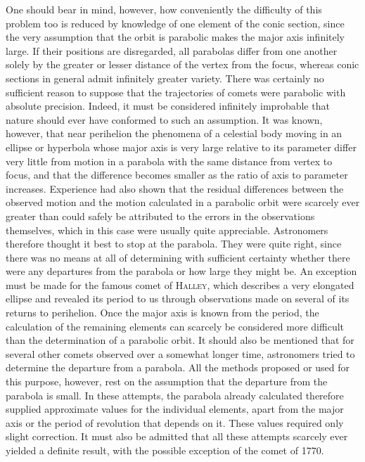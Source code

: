 One should bear in mind, however, how conveniently the difficulty of this problem too is reduced by knowledge of one element of the conic section, since the very assumption that the orbit is parabolic makes the major axis infinitely large. If their positions are disregarded, all parabolas differ from one another solely by the greater or lesser distance of the vertex from the focus, whereas conic sections in general admit infinitely greater variety. There was certainly no sufficient reason to suppose that the trajectories of comets were parabolic with absolute precision. Indeed, it must be considered infinitely improbable that nature should ever have conformed to such an assumption. It was known, however, that near perihelion the phenomena of a celestial body moving in an ellipse or hyperbola whose major axis is very large relative to its parameter differ very little from motion in a parabola with the same distance from vertex to focus, and that the difference becomes smaller as the ratio of axis to parameter increases. Experience had also shown that the residual differences between the observed motion and the motion calculated in a parabolic orbit were scarcely ever greater than could safely be attributed to the errors in the observations themselves, which in this case were usually quite appreciable. Astronomers therefore thought it best to stop at the parabola. They were quite right, since there was no means at all of determining with sufficient certainty whether there were any departures from the parabola or how large they might be. An exception must be made for the famous comet of \textsc{Halley}, which describes a very elongated ellipse and revealed its period to us through observations made on several of its
returns to perihelion. Once the major axis is known from the period, the calculation of the remaining elements can scarcely be considered more difficult than the determination of a parabolic orbit. It should also be mentioned that for several other comets observed over a somewhat longer time, astronomers tried to determine the departure from a parabola. All the methods proposed or used for this purpose, however, rest on the assumption that the departure from the parabola is small. In these attempts, the parabola already calculated therefore supplied approximate values for the individual elements, apart from the major axis or the period of revolution that depends on it. These values required only slight correction. It must also be admitted that all these attempts scarcely ever yielded a definite result, with the possible exception of the comet of 1770.

